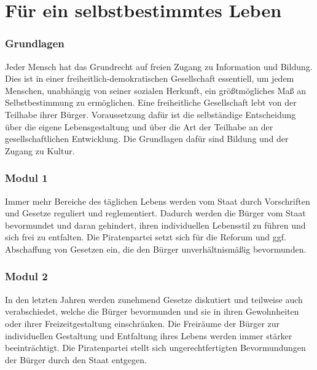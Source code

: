 \section{Für ein selbstbestimmtes Leben}


\subsubsection{Grundlagen}
\abstimmung
Jeder Mensch hat das Grundrecht auf freien Zugang zu Information und Bildung. Dies ist in einer freiheitlich-demokratischen Gesellschaft essentiell, um jedem Menschen, unabhängig von seiner sozialen Herkunft, ein größtmögliches Maß an Selbstbestimmung zu ermöglichen. Eine freiheitliche Gesellschaft lebt von der Teilhabe ihrer Bürger. Voraussetzung dafür ist die selbständige Entscheidung über die eigene Lebensgestaltung und über die Art der Teilhabe an der gesellschaftlichen Entwicklung. Die Grundlagen dafür sind Bildung und der Zugang zu Kultur.
 

\subsubsection{Modul 1}
\abstimmung
Immer mehr Bereiche des täglichen Lebens werden vom Staat durch Vorschriften und Gesetze reguliert und reglementiert. Dadurch werden die Bürger vom Staat bevormundet und daran gehindert, ihren individuellen Lebensstil zu führen und sich frei zu entfalten. Die Piratenpartei setzt sich für die Reforum und ggf. Abschaffung von Gesetzen ein, die den Bürger unverhältnismäßig bevormunden.

\subsubsection{Modul 2}
\abstimmung
In den letzten Jahren werden zunehmend Gesetze diskutiert und teilweise auch verabschiedet, welche die Bürger bevormunden und sie in ihren Gewohnheiten oder ihrer Freizeitgestaltung einschränken. Die Freiräume der Bürger zur individuellen Gestaltung und Entfaltung ihres Lebens werden immer stärker beeinträchtigt. Die Piratenpartei stellt sich ungerechtfertigten Bevormundungen der Bürger durch den Staat entgegen.
 


